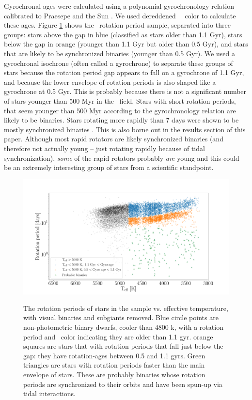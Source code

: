 Gyrochronal ages were calculated using a polynomial gyrochronology relation
calibrated to Praesepe and the Sun \citep{angus2019}.
We used dereddened \gaia\ \gcolor\ color to calculate these ages.
Figure \ref{fig:period_teff} shows the \mct\ rotation period sample, separated
into three groups: stars above the gap in blue (classified as stars older than
1.1 Gyr), stars below the gap in orange (younger than 1.1 Gyr but older than
0.5 Gyr), and stars that are likely to be synchronized binaries (younger than
0.5 Gyr).
We used a gyrochronal isochrone (often called a gyrochrone) to separate these
groups of stars because the rotation period gap appears to fall on a
gyrochrone of 1.1 Gyr, and because the lower envelope of rotation periods is
also shaped like a gyrochrone at 0.5 Gyr.
This is probably because there is not a significant number of stars younger
than 500 Myr in the \kepler\ field.
Stars with short rotation periods, that seem younger than 500 Myr according to
the \citet{angus2019} gyrochronology relation are likely to be binaries.
Stars rotating more rapidly than 7 days were shown to be mostly synchronized
binaries \citep{citation}.
This is also borne out in the results section of this paper.
Although most rapid rotators are likely synchronized binaries (and therefore
not actually young -- just rotating rapidly because of tidal synchronization),
{\it some} of the rapid rotators probably {\it are} young and this could be an
extremely interesting group of stars from a scientific standpoint.

\begin{figure}
  \caption{
The rotation periods of stars in the \citet{mcquillan2014} sample vs.
effective temperature, with visual binaries and subgiants removed.
Blue circle points are non-photometric binary dwarfs, cooler than 4800 k, with
a rotation period and \gaia\ color indicating they are older than 1.1 gyr.
orange squares are stars that with rotation periods that fall just below the
gap: they have rotation-ages between 0.5 and 1.1 gyrs.
Green triangles are stars with rotation periods faster than the main envelope
of stars.
These are probably binaries whose rotation periods are synchronized to their
orbits and have been spun-up via tidal interactions.
}
  \centering
    \includegraphics[width=1\textwidth]{period_teff}
\label{fig:period_teff}
\end{figure}
